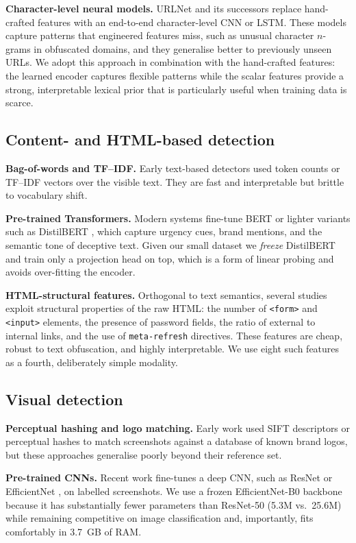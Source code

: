 \documentclass[conference]{IEEEtran}
\begin{document}
\noindent\textbf{Character-level neural models.} URLNet
\cite{urlnet} and its successors replace hand-crafted features with
an end-to-end character-level CNN or LSTM. These models capture
patterns that engineered features miss, such as unusual character
$n$-grams in obfuscated domains, and they generalise better to
previously unseen URLs. We adopt this approach in combination with
the hand-crafted features: the learned encoder captures flexible
patterns while the scalar features provide a strong, interpretable
lexical prior that is particularly useful when training data is
scarce.

\subsection{Content- and HTML-based detection}
\noindent\textbf{Bag-of-words and TF--IDF.} Early text-based
detectors used token counts or TF--IDF vectors over the visible
text. They are fast and interpretable but brittle to vocabulary
shift.

\noindent\textbf{Pre-trained Transformers.} Modern systems fine-tune
BERT \cite{bert} or lighter variants such as DistilBERT
\cite{distilbert}, which capture urgency cues, brand mentions, and
the semantic tone of deceptive text. Given our small dataset we
\emph{freeze} DistilBERT and train only a projection head on top,
which is a form of linear probing and avoids over-fitting the
encoder.

\noindent\textbf{HTML-structural features.} Orthogonal to text
semantics, several studies exploit structural properties of the raw
HTML: the number of \texttt{<form>} and \texttt{<input>} elements,
the presence of password fields, the ratio of external to internal
links, and the use of \texttt{meta-refresh} directives. These
features are cheap, robust to text obfuscation, and highly
interpretable. We use eight such features as a fourth, deliberately
simple modality.

\subsection{Visual detection}
\noindent\textbf{Perceptual hashing and logo matching.} Early work
used SIFT descriptors or perceptual hashes to match screenshots
against a database of known brand logos, but these approaches
generalise poorly beyond their reference set.

\noindent\textbf{Pre-trained CNNs.} Recent work fine-tunes a deep
CNN, such as ResNet or EfficientNet \cite{effnet}, on labelled
screenshots. We use a frozen EfficientNet-B0 backbone because it
has substantially fewer parameters than ResNet-50 (5.3M vs.\ 25.6M)
while remaining competitive on image classification and,
importantly, fits comfortably in 3.7~GB of RAM.
\end{document}
